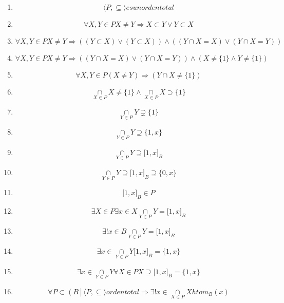 \documentclass[
]{article}
\providecommand{\tightlist}{%
  \setlength{\itemsep}{0pt}\setlength{\parskip}{0pt}}
\begin{document}
\begin{enumerate}
\begin{enumerate}
\begin{enumerate}
      \begin{enumerate}
      \def\labelenumiv{\arabic{enumiv}.}
      \tightlist
      \item
        \[{\langle{P, \subseteq}\rangle}\mathit{es}\mathit{un}\mathit{orden}\mathit{total}\]
      \item
        \[\forall X,{Y \in P}{X \neq Y}\Rightarrow{{X \subset {Y \vee Y}} \subset X}\]
      \item
        \[\forall X,{Y \in P}{X \neq Y}\Rightarrow{\left( {\left( {Y \subset X} \right) \vee \left( {Y \subset X} \right)} \right) \land \left( {\left( {{Y \cap X} = X} \right) \vee \left( {{Y \cap X} = Y} \right)} \right)}\]
      \item
        \[\forall X,{Y \in P}{X \neq Y}\Rightarrow{\left( {\left( {{Y \cap X} = X} \right) \vee \left( {{Y \cap X} = Y} \right)} \right) \land \left( {{X \neq {{\{ 1\}} \land Y}} \neq {\{ 1\}}} \right)}\]
      \item
        \[\forall X,{Y \in P}\left( {X \neq Y} \right)\Rightarrow\left( {{Y \cap X} \neq {\{ 1\}}} \right)\]
      \item
        \[\underset{X \in P}{\cap}{X \neq {{\{ 1\}} \land \underset{X \in P}{\cap}}}{X \supset {\{ 1\}}}\]
      \item
        \[\underset{Y \in P}{\cap}Y \supsetneq {\{ 1\}}\]
      \item
        \[\underset{Y \in P}{\cap}{Y \supseteq {\{{1,x}\}}}\]
      \item
        \[\underset{Y \in P}{\cap}{Y \supseteq {\lbrack{1,x}\rbrack}_{B}}\]
      \item
        \[\underset{Y \in P}{\cap}{{Y \supseteq {\lbrack{1,x}\rbrack}_{B}} \supseteq {\{{0,x}\}}}\]
      \item
        \[{\lbrack{1,x}\rbrack}_{B} \in P\]
      \item
        \[\exists{X \in P}\exists{x \in X}{\underset{Y \in P}{\cap}{Y = {\lbrack{1,x}\rbrack}_{B}}}\]
      \item
        \[\exists!{x \in B}{\underset{Y \in P}{\cap}{Y = {\lbrack{1,x}\rbrack}_{B}}}\]
      \item
        \[\exists{x \in {\underset{Y \in P}{\cap}Y{{\lbrack{1,x}\rbrack}_{B} = {\{{1,x}\}}}}}\]
      \item
        \[\exists{x \in {\underset{Y \in P}{\cap}Y\forall{X \in P}{{X \supseteq {\lbrack{1,x}\rbrack}_{B}} = {\{{1,x}\}}}}}\]
      \item
        \[\forall{P \subset \left( B \right\rbrack}{\langle{P, \subseteq}\rangle}\mathit{orden}\mathit{total}\Rightarrow\exists!{x \in \underset{X \in P}{\cap}}X\mathsf{\mathit{htom}}_{B}{(x)}\]

\end{enumerate}
\end{enumerate}
\end{enumerate}
\end{enumerate}
\end{document}
